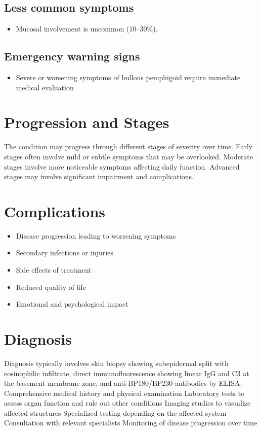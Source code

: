 \subsection{Less common symptoms}
\begin{itemize}[noitemsep]
  \item Mucosal involvement is uncommon (10--30\%).
\end{itemize}

\subsection{Emergency warning signs}
\begin{itemize}[noitemsep]
  \item Severe or worsening symptoms of bullous pemphigoid require immediate medical evaluation
\end{itemize}
\section{Progression and Stages}
The condition may progress through different stages of severity over time. Early stages often involve mild or subtle symptoms that may be overlooked. Moderate stages involve more noticeable symptoms affecting daily function. Advanced stages may involve significant impairment and complications.
\section{Complications}
\begin{itemize}[noitemsep]
  \item Disease progression leading to worsening symptoms
  \item Secondary infections or injuries
  \item Side effects of treatment
  \item Reduced quality of life
  \item Emotional and psychological impact
\end{itemize}
\section{Diagnosis}
Diagnosis typically involves skin biopsy showing subepidermal split with eosinophilic infiltrate, direct immunofluorescence showing linear IgG and C3 at the basement membrane zone, and anti-BP180/BP230 antibodies by ELISA. Comprehensive medical history and physical examination Laboratory tests to assess organ function and rule out other conditions Imaging studies to visualize affected structures Specialized testing depending on the affected system Consultation with relevant specialists Monitoring of disease progression over time

